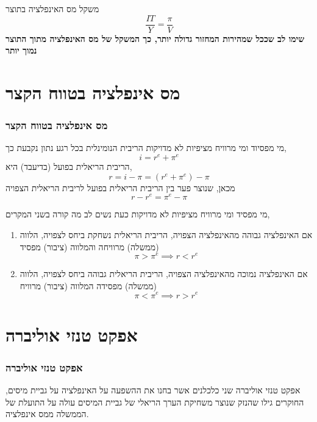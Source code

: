 \documentclass[10pt,usenames,dvipsnames]{beamer}
\begin{document}
\begin{RTL}
\begin{frame}
    \begin{block}{משקל מס האינפלציה בתוצר}
        \begin{equation*}
            \frac{IT}{Y} = \frac{\pi}{V}
        \end{equation*}    
        \textbf{שימו לב שככל שמהירות המחזור גדולה יותר, כך המשקל של מס האינפלציה מתוך התוצר נמוך יותר}
    \end{block}
    
    
    

\end{frame}

\section{מס אינפלציה בטווח הקצר}
\begin{frame}[allowframebreaks]
    \frametitle{מס אינפלציה בטווח הקצר}
    \begin{block}{מי מפסיוד ומי מרוויח מציפיות לא מדויקות}
        הריבית הנומינלית בכל רגע נתון נקבעת כך, 
        $$i = r^e + \pi^e$$
        הריבית הריאלית בפועל (בדיעבד) היא,
        $$r = i - \pi = (r^e + \pi^e) - \pi$$
        מכאן, שנוצר פער בין הריבית הריאלית בפועל לריבית הריאלית הצפויה
        $$r - r^e = \pi^e - \pi$$ 
    \end{block}
    \framebreak
    \begin{block}{מי מפסיד ומי מרוויח מציפיות לא מדויקות}
    כעת נשים לב מה קורה בשני המקרים,
    \begin{enumerate}
        \item אם האינפלציה גבוהה מהאינפלציה הצפויה, הריבית הריאלית נשחקת ביחס לצפויה, הלווה (ממשלה) מרוויחה והמלווה (ציבור) מפסיד
        $$\pi > \pi^e \implies r < r^e$$
        \item אם האינפלציה נמוכה מהאינפלציה הצפויה, הריבית הריאלית גבוהה ביחס לצפויה, הלווה (ממשלה) מפסידה המלווה (ציבור) מרוויח 
        $$\pi < \pi^e \implies r > r^e$$
    \end{enumerate}
    \end{block}

\end{frame}


\section {אפקט טנזי אוליברה}
\begin{frame}
    \frametitle{אפקט טנזי אוליברה}
    \begin{block}{אפקט טנזי אוליברה}
        שני כלכלנים אשר בחנו את ההשפעה על האינפלציה על גביית מיסים, החוקרים גילו שהנזק שנוצר משחיקת
הערך הריאלי של גביית המיסים עולה על התועלת של הממשלה ממס אינפלציה. 
    \end{block}
    

\end{frame}
\end{RTL}
\end{document}
